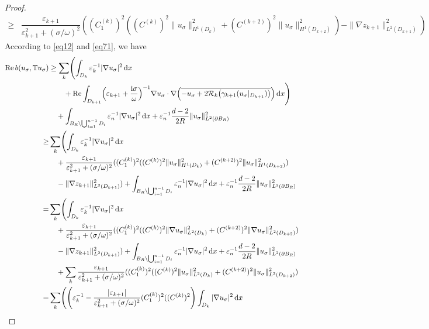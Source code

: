 \documentclass[12pt,reqno]{amsart}
\numberwithin{equation}{section}
\begin{document}
\begin{proof}
\begin{equation}
\begin{aligned}
\geq&\dfrac{\varepsilon_{k+1}}{\varepsilon_{k+1}^2+(\sigma/\omega)^2}((C_1^{(k)})^2((C^{(k)})^2\|u_\sigma\|^2_{H^1(D_{k})}+(C^{(k+2)})^2\|u_\sigma\|^2_{H^1(D_{k+2})})-\|\nabla z_{k+1}\|_{L^2(D_{k+1})}^2)
\end{aligned}
\end{equation}
According to \eqref{eq12} and \eqref{eq71}, we have
\begin{align*}
\operatorname{Re}b(u_\sigma,\mathbb{T}u_\sigma)
&\ge\sum_{k}\Biggl(\int_{D_k}\varepsilon_k^{-1}|\nabla u_\sigma|^2\,{\rm d}x\\
&\qquad+ \operatorname{Re}\int_{D_{k+1}} \Bigl(\varepsilon_{k+1} + \frac{{\rm i}\sigma}{\omega}\Bigr)^{-1}
    \nabla u_\sigma \cdot \nabla \Bigl( \overline{-u_\sigma + 2\mathcal{R}_k\bigl(\gamma_{k+1}(u_\sigma|_{D_{k+1}})\bigr)} \Bigr) \, {\rm d}x \Biggr)\\
&\quad+\int_{B_{R}\setminus\bigcup_{i=1}^{n-1}D_i}\varepsilon_n^{-1}|\nabla u_\sigma|^2\,{\rm d}x
+\varepsilon_n^{-1}\frac{d-2}{2R}\|u_\sigma\|_{L^2(\partial B_R)}^2\\
\geq&\sum_{k}\Biggl(\int_{D_k}\varepsilon_k^{-1}|\nabla u_\sigma|^2\,{\rm d}x\\
&\quad+ \dfrac{\varepsilon_{k+1}}{\varepsilon_{k+1}^2+(\sigma/\omega)^2}((C_1^{(k)})^2((C^{(k)})^2\|u_\sigma\|^2_{H^1(D_{k})}+(C^{(k+2)})^2\|u_\sigma\|^2_{H^1(D_{k+2})})\\
&\quad-\|\nabla z_{k+1}\|_{L^2(D_{k+1})}^2)+\int_{B_{R}\setminus\bigcup_{i=1}^{n-1}D_i}\varepsilon_n^{-1}|\nabla u_\sigma|^2\,{\rm d}x
+\varepsilon_n^{-1}\frac{d-2}{2R}\|u_\sigma\|_{L^2(\partial B_R)}^2\\
=&\sum_k\Biggl(\int_{D_k}\varepsilon_k^{-1}|\nabla u_\sigma|^2\,{\rm d}x\\
&\quad+ \dfrac{\varepsilon_{k+1}}{\varepsilon_{k+1}^2+(\sigma/\omega)^2}((C_1^{(k)})^2((C^{(k)})^2\|\nabla u_\sigma\|^2_{L^2(D_{k})}+(C^{(k+2)})^2\|\nabla u_\sigma\|^2_{L^2(D_{k+2})})\\
&\quad-\|\nabla z_{k+1}\|_{L^2(D_{k+1})}^2)+\int_{B_{R}\setminus\bigcup_{i=1}^{n-1}D_i}\varepsilon_n^{-1}|\nabla u_\sigma|^2\,{\rm d}x
+\varepsilon_n^{-1}\frac{d-2}{2R}\|u_\sigma\|_{L^2(\partial B_R)}^2\\
&\quad+\sum_k\dfrac{\varepsilon_{k+1}}{\varepsilon_{k+1}^2+(\sigma/\omega)^2}((C_1^{(k)})^2((C^{(k)})^2\|u_\sigma\|^2_{L^2(D_{k})}+(C^{(k+2)})^2\| u_\sigma\|^2_{L^2(D_{k+2})})\\
=&\sum_k\Biggl(\Bigg(\varepsilon_k^{-1}-\dfrac{|\varepsilon_{k+1}|}{\varepsilon_{k+1}^2+(\sigma/\omega)^2}(C_1^{(k)})^2((C^{(k)})^2\Bigg)\int_{D_k}|\nabla u_\sigma|^2\,{\rm d}x\\

\end{align*}
\end{proof}
\end{document}
